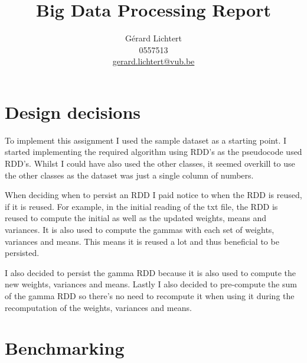 \documentclass{article}
\title{Big Data Processing Report}
\author{Gérard Lichtert\\
0557513\\
\href{mailto:gerard.lichtert@vub.be}{gerard.lichtert@vub.be}
}
\begin{document}
\maketitle

\tableofcontents
\newpage
\raggedright
\section{Design decisions}
\label{sec:design-decisions}
To implement this assignment I used the sample dataset as a starting point.
I started implementing the required algorithm using RDD's as the pseudocode used RDD's.
Whilst I could have also used the other classes, it seemed overkill to use the other classes as the dataset was just a single column of numbers.
\par
When deciding when to persist an RDD I paid notice to when the RDD is reused, if it is reused.
For example, in the initial reading of the txt file, the RDD is reused to compute the initial as well as the updated weights, means and variances.
It is also used to compute the gammas with each set of weights, variances and means.
This means it is reused a lot and thus beneficial to be persisted.
\par
I also decided to persist the gamma RDD because it is also used to compute the new weights, variances and means.
Lastly I also decided to pre-compute the sum of the gamma RDD so there's no need to recompute it when using it during the recomputation of the weights, variances and means.
\section{Benchmarking}
\end{document}
